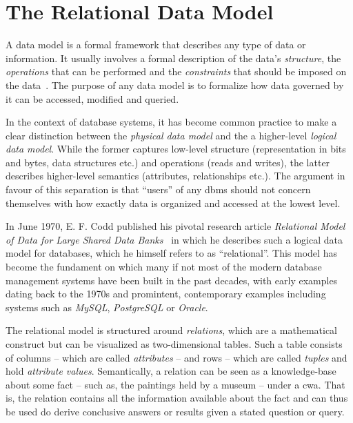 \section{The Relational Data Model}
\label{section:relational_data_model}

A data model is a formal framework that describes any type of data or information. It usually involves a formal description of the data's \emph{structure}, the \emph{operations} that can be performed and the \emph{constraints} that should be imposed on the data~\cite{Garcia:2009Database}. The purpose of any data model is to formalize how data governed by it can be accessed, modified and queried.

In the context of database systems, it has become common practice to make a clear distinction between the \emph{physical data model} and the a higher-level \emph{logical data model}. While the former captures low-level structure (representation in bits and bytes, data structures etc.) and operations (reads and writes), the latter describes higher-level semantics (attributes, relationships etc.). The argument in favour of this separation is that ``users'' of any \gls{dbms} should not concern themselves with how exactly data is organized and accessed at the lowest level.

In June 1970, E. F. Codd published his pivotal research article \emph{Relational Model of Data for Large Shared Data Banks}~\cite{Codd:1970Relational} in which he describes such a logical data model for databases, which he himself refers to as ``relational''. This model has become the fundament on which many if not most of the modern database management systems have been built in the past decades, with early examples dating back to the 1970s \cite{Astrahan:1976Systemr} and promintent, contemporary examples including systems such as \emph{MySQL}, \emph{PostgreSQL} or \emph{Oracle}. 

The relational model is structured around \emph{relations}, which are a mathematical construct but can be visualized as two-dimensional tables. Such a table consists of columns -- which are called \emph{attributes} -- and rows -- which are called \emph{tuples} and hold \emph{attribute values}. Semantically, a relation can be seen as a knowledge-base about some fact -- such as, the paintings held by a museum -- under a \gls{cwa}{}. That is, the relation contains all the information available about the fact and can thus be used do derive conclusive answers or results given a stated question or query.


